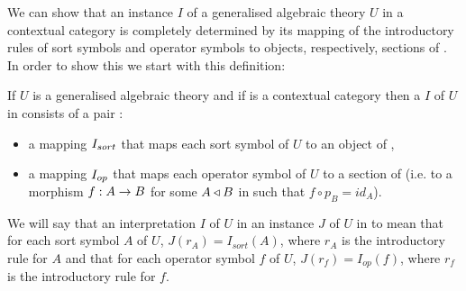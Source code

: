 We can show that an instance $I$ of a generalised algebraic theory $U$ in a contextual category \catcw is
completely determined by its mapping of the introductory rules of sort symbols and operator symbols to
objects, respectively, sections of \catc. In order to show this we start with this definition:
\begin{definition}
If $U$ is a generalised algebraic theory  and if \catcw is a contextual category then
a  $I$ of  $U$ in \catcw consists of a pair :
\begin{itemize}
\item a mapping $I_{sort}$ that maps each sort symbol of $U$ to  an object of \catc,
\item a mapping $I_{op}$ that maps each operator symbol of $U$ to a section of \catcw (i.e. to a morphism $f: A \rightarrow B$ for some 
$A \triangleleft B$ in \catcw such that $f \circ p_B=id_A$).
\end{itemize}
\end{definition}


We will say that  an interpretation $I$ of $U$ in \catcw {} an  instance $J$ of $U$ in \catcw to mean that for each sort symbol $A$ of $U$,
$J(r_A) = I_{sort}(A)$, where $r_A$ is the introductory rule for $A$ and that for each operator symbol
$f$ of $U$,   $J(r_f) = I_{op}(f)$, where $r_f$ is the introductory rule for $f$.

\newcommand{\Ibar}{\mkern 2.5mu\overline{\mkern-2.5mu I\mkern1.5mu}\mkern -1.5mu}

